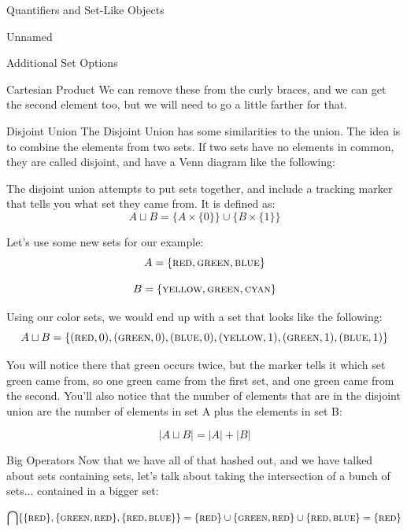 \begin{part}{Quantifiers and Set-Like Objects}
\begin{chapter}{Unnamed}
\begin{section}{Additional Set Options}
\begin{subsection}{Cartesian Product}
                We can remove these from the curly braces, and we can get the second element too, but we will need to go a little farther for that.
            \end{subsection}
            \begin{subsection}{Disjoint Union}
                The Disjoint Union has some similarities to the union. The idea is to combine the elements from two sets. If two sets have no elements in common, they are called disjoint, and have a Venn diagram like the following:
                
                The disjoint union attempts to put sets together, and include a tracking marker that tells you what set they came from. It is defined as:
                $$
                    A \sqcup B = \{A \times \{0\}\} \cup \{B \times \{1\}\}
                $$
                
                Let's use some new sets for our example:
                $$
                    A = \{\textsc{red}, \textsc{green}, \textsc{blue}\}
                $$
                
                $$
                    B = \{\textsc{yellow}, \textsc{green}, \textsc{cyan}\}
                $$
                
                Using our color sets, we would end up with a set that looks like the following:
                $$
                    A \sqcup B = \{ (\textsc{red}, 0), (\textsc{green}, 0), (\textsc{blue}, 0), (\textsc{yellow}, 1), (\textsc{green}, 1), (\textsc{blue}, 1)\}
                $$
                
                You will notice there that green occurs twice, but the marker tells it which set green came from, so one green came from the first set, and one green came from the second. You'll also notice that the number of elements that are in the disjoint union are the number of elements in set A plus the elements in set B:
                
                $$
                    |A \sqcup B| = |A| + |B|  
                $$
            \end{subsection}
            \begin{subsection}{Big Operators}
                Now that we have all of that hashed out, and we have talked about sets containing sets, let's talk about taking the intersection of a bunch of sets... contained in a bigger set:
                
                $$
                    \bigcap \{ \{ \textsc{red} \}, \{ \textsc{green}, \textsc{red} \}, \{\textsc{red}, \textsc{blue}\} \}=
                    \{ \textsc{red} \} \cup \{ \textsc{green}, \textsc{red} \} \cup \{\textsc{red}, \textsc{blue}\} = \{ \textsc{red} \}
                $$
                

\end{subsection}
\end{section}
\end{chapter}
\end{part}
